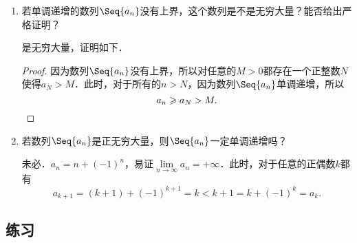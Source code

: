 \begin{enumerate}
\item 若单调递增的数列\(\Seq{a_n}\)没有上界，这个数列是不是无穷大量？能否给出严格证明？

  \ifshowsolp
    是无穷大量，证明如下．

    \begin{proof}
      因为数列\(\Seq{a_n}\)没有上界，所以对任意的\(M > 0\)都存在一个正整数\(N\)使得\(a_N > M\)．此时，对于所有的\(n > N\)，因为数列\(\Seq{a_n}\)单调递增，所以
      \begin{equation*}
        a_n \ge a_N > M. \qedhere
      \end{equation*}
    \end{proof}
  \fi

\item 若数列\(\Seq{a_n}\)是正无穷大量，则\(\Seq{a_n}\)一定单调递增吗？

  \ifshowsolp
    未必．\(a_n = n + (-1)^n\)，易证\(\lim\limits_{n\to\infty} a_n = +\infty\)．此时，对于任意的正偶数\(k\)都有
    \begin{equation*}
      a_{k+1} = (k+1) + (-1)^{k+1} = k < k + 1 = k + (-1)^k = a_k.
    \end{equation*}
  \fi
\end{enumerate}

\ifshowex
{}
\subsection*{练习}

